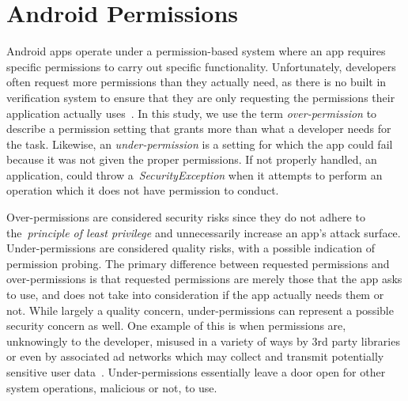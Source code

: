 \documentclass{sig-alternate-05-2015}
\begin{document}
\section{Android Permissions}
\label{sec: androidPermissions}

Android apps operate under a permission-based system where an app requires specific permissions to carry out specific functionality. Unfortunately, developers often request more permissions than they actually need, as there is no built in verification system to ensure that they are only requesting the permissions their application actually uses~\cite{Felt:2011:APD:2046707.2046779}. In this study, we use the term \emph{over-permission} to describe a permission setting that grants more than what a developer needs for the task. Likewise, an \emph{under-permission} is a setting for which the app could fail because it was not given the proper permissions. If not properly handled, an application, could throw a~\emph{SecurityException} when it attempts to perform an operation which it does not have permission to conduct.

Over-permissions are considered security risks since they do not adhere to the~\emph{principle of least privilege} and unnecessarily increase an app's attack surface. Under-permissions are considered quality risks, with a possible indication of permission probing. The primary difference between requested permissions and over-permissions is that requested permissions are merely those that the app asks to use, and does not take into consideration if the app actually needs them or not. While largely a quality concern, under-permissions can represent a possible security concern as well. One example of this is when permissions are, unknowingly to the developer, misused in a variety of ways by 3rd party libraries or even by associated ad networks which may collect and transmit potentially sensitive user data~\cite{Grace:2012:UEA:2185448.2185464}. Under-permissions essentially leave a door open for other system operations, malicious or not, to use.
\end{document}
